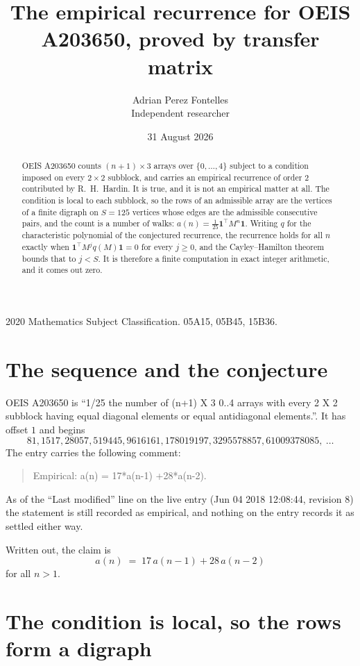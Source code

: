 \documentclass[11pt,a4paper]{article}
\title{The empirical recurrence for OEIS A203650, proved by transfer matrix}
\author{Adrian Perez Fontelles\\ \small Independent researcher}
\date{31 August 2026}
\theoremstyle{plain}
\theoremstyle{definition}
\begin{document}
\maketitle

\begin{abstract}
OEIS A203650 counts $(n+1)\times3$ arrays over $\{0,\dots,4\}$ subject to a condition imposed on
every $2\times2$ subblock, and carries an empirical recurrence of order $2$ contributed
by R.~H.~Hardin. It is true, and it is not an empirical matter at all. The condition is local
to each subblock, so the rows of an admissible array are the vertices of a finite digraph
on $S=125$ vertices whose edges are the admissible consecutive pairs, and the count is a
number of walks: $a(n)=\tfrac1{25}\mathbf{1}^{\!\top}M^{n}\mathbf{1}$. Writing $q$
for the characteristic polynomial of the conjectured recurrence, the recurrence holds for all
$n$ exactly when $\mathbf{1}^{\!\top}M^{j}q(M)\mathbf{1}=0$ for every $j\ge0$, and the
Cayley--Hamilton theorem bounds that to $j<S$. It is therefore a finite computation in exact
integer arithmetic, and it comes out zero.
\end{abstract}

\noindent\small 2020 Mathematics Subject Classification. 05A15, 05B45, 15B36.\normalsize

\section{The sequence and the conjecture}

OEIS A203650 is ``1/25 the number of (n+1) X 3 0..4 arrays with every 2 X 2 subblock having equal diagonal elements or equal antidiagonal elements.''. It has offset $1$ and begins
\[
81, 1517, 28057, 519445, 9616161, 178019197, 3295578857, 61009378085,\ \dots
\]
The entry carries the following comment:
\begin{quote}\small
Empirical: a(n) = 17*a(n-1) +28*a(n-2).
\end{quote}
As of the ``Last modified'' line on the live entry (Jun 04 2018 12:08:44, revision 8) the statement is
still recorded as empirical, and nothing on the entry records it as settled either way.

Written out, the claim is
\begin{equation}\label{eq:conj}
a(n)\;=\;17\,a(n-1) + 28\,a(n-2)
\end{equation}
for all $n>1$.

\section{The condition is local, so the rows form a digraph}
\end{document}
